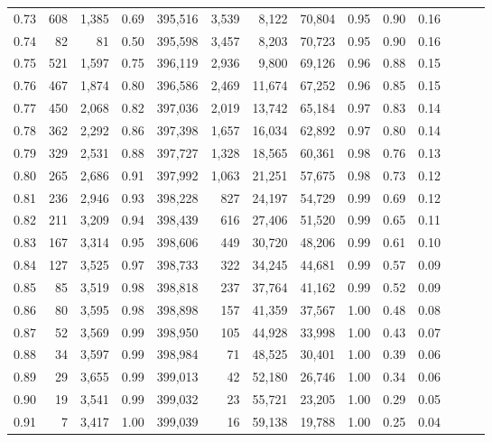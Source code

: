 \begin{tabular}{rrrrrrrrrrrrrr}
0.73 &    608 &  1,385 &  0.69 &  395,516 &    3,539 &   8,122 &  70,804 &  0.95 &  0.90 &      0.16 \\
0.74 &     82 &     81 &  0.50 &  395,598 &    3,457 &   8,203 &  70,723 &  0.95 &  0.90 &      0.16 \\
0.75 &    521 &  1,597 &  0.75 &  396,119 &    2,936 &   9,800 &  69,126 &  0.96 &  0.88 &      0.15 \\
0.76 &    467 &  1,874 &  0.80 &  396,586 &    2,469 &  11,674 &  67,252 &  0.96 &  0.85 &      0.15 \\
0.77 &    450 &  2,068 &  0.82 &  397,036 &    2,019 &  13,742 &  65,184 &  0.97 &  0.83 &      0.14 \\
0.78 &    362 &  2,292 &  0.86 &  397,398 &    1,657 &  16,034 &  62,892 &  0.97 &  0.80 &      0.14 \\
0.79 &    329 &  2,531 &  0.88 &  397,727 &    1,328 &  18,565 &  60,361 &  0.98 &  0.76 &      0.13 \\
0.80 &    265 &  2,686 &  0.91 &  397,992 &    1,063 &  21,251 &  57,675 &  0.98 &  0.73 &      0.12 \\
0.81 &    236 &  2,946 &  0.93 &  398,228 &      827 &  24,197 &  54,729 &  0.99 &  0.69 &      0.12 \\
0.82 &    211 &  3,209 &  0.94 &  398,439 &      616 &  27,406 &  51,520 &  0.99 &  0.65 &      0.11 \\
0.83 &    167 &  3,314 &  0.95 &  398,606 &      449 &  30,720 &  48,206 &  0.99 &  0.61 &      0.10 \\
0.84 &    127 &  3,525 &  0.97 &  398,733 &      322 &  34,245 &  44,681 &  0.99 &  0.57 &      0.09 \\
0.85 &     85 &  3,519 &  0.98 &  398,818 &      237 &  37,764 &  41,162 &  0.99 &  0.52 &      0.09 \\
0.86 &     80 &  3,595 &  0.98 &  398,898 &      157 &  41,359 &  37,567 &  1.00 &  0.48 &      0.08 \\
0.87 &     52 &  3,569 &  0.99 &  398,950 &      105 &  44,928 &  33,998 &  1.00 &  0.43 &      0.07 \\
0.88 &     34 &  3,597 &  0.99 &  398,984 &       71 &  48,525 &  30,401 &  1.00 &  0.39 &      0.06 \\
0.89 &     29 &  3,655 &  0.99 &  399,013 &       42 &  52,180 &  26,746 &  1.00 &  0.34 &      0.06 \\
0.90 &     19 &  3,541 &  0.99 &  399,032 &       23 &  55,721 &  23,205 &  1.00 &  0.29 &      0.05 \\
0.91 &      7 &  3,417 &  1.00 &  399,039 &       16 &  59,138 &  19,788 &  1.00 &  0.25 &      0.04 \\

\end{tabular}
